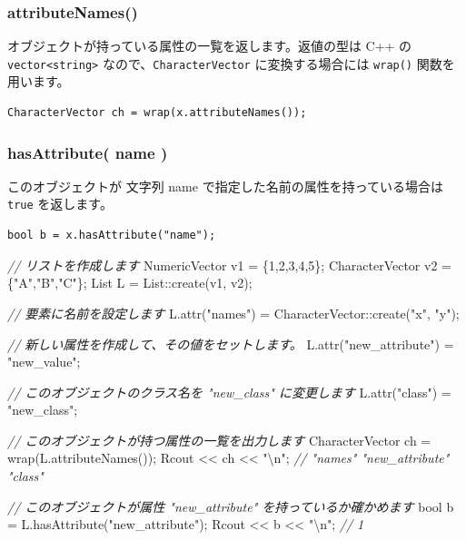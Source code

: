 \documentclass[]{book}
\newenvironment{Shaded}{\begin{snugshade}}{\end{snugshade}}
\newcommand{\CommentTok}[1]{\textcolor[rgb]{0.56,0.35,0.01}{\textit{#1}}}
\newcommand{\DataTypeTok}[1]{\textcolor[rgb]{0.13,0.29,0.53}{#1}}
\newcommand{\DecValTok}[1]{\textcolor[rgb]{0.00,0.00,0.81}{#1}}
\newcommand{\NormalTok}[1]{#1}
\newcommand{\SpecialCharTok}[1]{\textcolor[rgb]{0.00,0.00,0.00}{#1}}
\newcommand{\StringTok}[1]{\textcolor[rgb]{0.31,0.60,0.02}{#1}}
\begin{document}
\hypertarget{attributenames-1}{%
\subsubsection{attributeNames()}\label{attributenames-1}}

オブジェクトが持っている属性の一覧を返します。返値の型は C++ の \texttt{vector\textless{}string\textgreater{}} なので、\texttt{CharacterVector} に変換する場合には \texttt{wrap()} 関数を用います。

\begin{verbatim}
CharacterVector ch = wrap(x.attributeNames());
\end{verbatim}

\hypertarget{hasattribute-name}{%
\subsubsection{hasAttribute( name )}\label{hasattribute-name}}

このオブジェクトが 文字列 name で指定した名前の属性を持っている場合は \texttt{true} を返します。

\begin{verbatim}
bool b = x.hasAttribute("name");
\end{verbatim}

\begin{Shaded}
\begin{Highlighting}[]
\CommentTok{// リストを作成します}
\NormalTok{NumericVector   v1 = \{}\DecValTok{1}\NormalTok{,}\DecValTok{2}\NormalTok{,}\DecValTok{3}\NormalTok{,}\DecValTok{4}\NormalTok{,}\DecValTok{5}\NormalTok{\};}
\NormalTok{CharacterVector v2 = \{}\StringTok{"A"}\NormalTok{,}\StringTok{"B"}\NormalTok{,}\StringTok{"C"}\NormalTok{\};}
\NormalTok{List L = List::create(v1, v2);}

\CommentTok{// 要素に名前を設定します}
\NormalTok{L.attr(}\StringTok{"names"}\NormalTok{) = CharacterVector::create(}\StringTok{"x"}\NormalTok{, }\StringTok{"y"}\NormalTok{);}

\CommentTok{// 新しい属性を作成して、その値をセットします。}
\NormalTok{L.attr(}\StringTok{"new_attribute"}\NormalTok{) = }\StringTok{"new_value"}\NormalTok{;}

\CommentTok{// このオブジェクトのクラス名を "new_class" に変更します}
\NormalTok{L.attr(}\StringTok{"class"}\NormalTok{) = }\StringTok{"new_class"}\NormalTok{;}

\CommentTok{// このオブジェクトが持つ属性の一覧を出力します}
\NormalTok{CharacterVector ch = wrap(L.attributeNames());}
\NormalTok{Rcout << ch << }\StringTok{"}\SpecialCharTok{\textbackslash{}n}\StringTok{"}\NormalTok{; }\CommentTok{// "names" "new_attribute" "class"}

\CommentTok{// このオブジェクトが属性 "new_attribute" を持っているか確かめます}
\DataTypeTok{bool}\NormalTok{ b = L.hasAttribute(}\StringTok{"new_attribute"}\NormalTok{);}
\NormalTok{Rcout << b << }\StringTok{"}\SpecialCharTok{\textbackslash{}n}\StringTok{"}\NormalTok{; }\CommentTok{// 1}
\end{Highlighting}
\end{Shaded}
\end{document}
